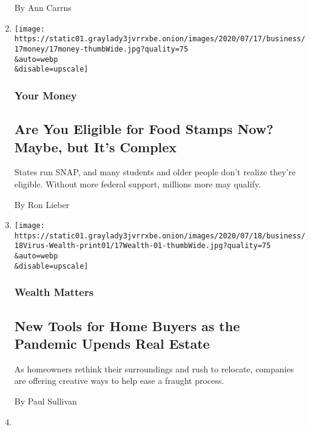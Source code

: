 \begin{enumerate}
  By Ann Carrns
\item
  \href{/2020/07/17/your-money/food-stamps-coronavirus.html}{}

  \texttt{[image: https://static01.graylady3jvrrxbe.onion/images/2020/07/17/business/17money/17money-thumbWide.jpg?quality=75\\\&auto=webp\\\&disable=upscale]}

  \hypertarget{your-money-1}{%
  \subsubsection{Your Money}\label{your-money-1}}

  \hypertarget{are-you-eligible-for-food-stamps-now-maybe-but-its-complex}{%
  \subsection{Are You Eligible for Food Stamps Now? Maybe, but It's
  Complex}\label{are-you-eligible-for-food-stamps-now-maybe-but-its-complex}}

  States run SNAP, and many students and older people don't realize
  they're eligible. Without more federal support, millions more may
  qualify.

  By Ron Lieber
\item
  \href{/2020/07/17/your-money/real-estate-relocation-coronavirus.html}{}

  \texttt{[image: https://static01.graylady3jvrrxbe.onion/images/2020/07/18/business/18Virus-Wealth-print01/17Wealth-01-thumbWide.jpg?quality=75\\\&auto=webp\\\&disable=upscale]}

  \hypertarget{wealth-matters-2}{%
  \subsubsection{Wealth Matters}\label{wealth-matters-2}}

  \hypertarget{new-tools-for-home-buyers-as-the-pandemic-upends-real-estate}{%
  \subsection{New Tools for Home Buyers as the Pandemic Upends Real
  Estate}\label{new-tools-for-home-buyers-as-the-pandemic-upends-real-estate}}

  As homeowners rethink their surroundings and rush to relocate,
  companies are offering creative ways to help ease a fraught process.

  By Paul Sullivan
\item
  \href{/2020/07/16/your-money/fiduciary-duty-investments-best-interest.html}{}


\end{enumerate}
